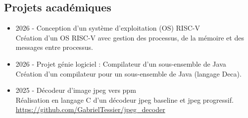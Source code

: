 \documentclass[10pt,oneside,a4paper,titlepage]{article}
\begin{document}
\begin{tcolorbox}
\begin{minipage}[t]{11.6cm}
\begin{tcolorbox}[grow to right by=0.75cm,colframe=white,colback=white]
      \section*{Projets académiques}
      \begin{itemize}
      \item 2026 - Conception d'un système d'exploitation (OS) RISC-V\\
      Création d'un OS RISC-V avec gestion des processus, de la mémoire et des messages entre processus.
      \item 2026 - Projet génie logiciel : Compilateur d'un sous-ensemble de Java\\
      Création d'un compilateur pour un sous-ensemble de Java (langage Deca).
      \item 2025 - Décodeur d'image jpeg vers ppm\\
      Réalisation en langage C d'un décodeur jpeg baseline et jpeg progressif.\\ \href{https://github.com/GabrielTessier/jpeg_decoder}{https://github.com/GabrielTessier/jpeg\_decoder}
      \end{itemize}

    \end{tcolorbox}
  \end{minipage}
\end{tcolorbox}
\end{document}

